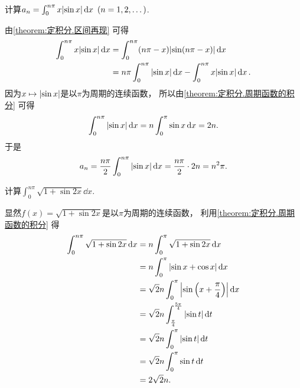 \begin{example}
计算\(a_n = \int_0^{n\pi} x \abs{\sin x} \dd{x}\ (n=1,2,\dotsc)\).
\begin{solution}
由\cref{theorem:定积分.区间再现} 可得\begin{align*}
	\int_0^{n\pi} x \abs{\sin x} \dd{x}
	&= \int_0^{n\pi} (n\pi-x) \abs{\sin(n\pi-x)} \dd{x} \\
	&= n\pi \int_0^{n\pi} \abs{\sin x} \dd{x}
		- \int_0^{n\pi} x \abs{\sin x} \dd{x}.
\end{align*}
因为\(x \mapsto \abs{\sin x}\)是以\(\pi\)为周期的连续函数，
所以由\cref{theorem:定积分.周期函数的积分} 可得\[
	\int_0^{n\pi} \abs{\sin x} \dd{x}
	= n \int_0^\pi \sin x \dd{x}
	= 2n.
\]
于是\[
	a_n = \frac{n\pi}2 \int_0^{n\pi} \abs{\sin x} \dd{x}
	= \frac{n\pi}2 \cdot 2n
	= n^2\pi.
\]
\end{solution}
\end{example}

\begin{example}
计算\(\int_0^{n\pi} \sqrt{1 + \sin2x} \dd{x}\).
\begin{solution}
显然\(f(x) = \sqrt{1 + \sin2x}\)是以\(\pi\)为周期的连续函数，
利用\cref{theorem:定积分.周期函数的积分} 得\begin{align*}
	\int_0^{n\pi} \sqrt{1 + \sin2x} \dd{x}
	&= n \int_0^\pi \sqrt{1 + \sin2x} \dd{x} \\
	&= n \int_0^\pi \abs{\sin x + \cos x} \dd{x} \\
	&= \sqrt2 n \int_0^\pi \abs{\sin\left(x + \frac\pi4\right)} \dd{x} \\
	&= \sqrt2 n \int_{\frac\pi4}^{\frac{5\pi}4} \abs{\sin t} \dd{t} \\
	&= \sqrt2 n \int_0^\pi \abs{\sin t} \dd{t} \\
	&= \sqrt2 n \int_0^\pi \sin t \dd{t} \\
	&= 2\sqrt2 n.
\end{align*}
\end{solution}
\end{example}

